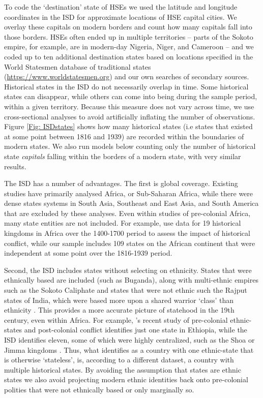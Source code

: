 To code the `destination' state of HSEs we used the latitude and longitude
coordinates in the ISD for approximate locations of HSE capital cities. We
overlay these capitals on modern borders and count how many capitals fall into
those borders. HSEs often ended up in multiple territories -- parts of the
Sokoto empire, for example, are in modern-day Nigeria, Niger, and Cameroon -- and
we coded up to ten additional destination states based on locations specified in
the World Statesmen database of traditional states
(\url{https://www.worldstatesmen.org}) and our own searches of secondary
sources. Historical states in the ISD do not necessarily overlap in time. Some
historical states can disappear, while others can come into being during the
sample period, within a given territory. Because this measure does not vary
across time, we use cross-sectional analyses to avoid artificially inflating the number of observations.  Figure \ref{Fig:
ISDstates} shows how many historical states (i.e states that existed at some
point between 1816 and 1939) are recorded within the boundaries of modern
states. We also run models below counting only the number of historical state
\textit{capitals} falling within the borders of a modern state, with very
similar results. 
    
The ISD has a number of advantages. The first is global coverage. Existing
studies have primarily analysed Africa, or Sub-Saharan Africa, while there were
dense states systems in South Asia, Southeast and East Asia, and South America
that are excluded by these analyses. Even within studies of pre-colonial Africa, many
state entities are not included. For example, \citet{Besley2014} use data for
19 historical kingdoms in Africa over the 1400-1700 period to assess the impact
of historical conflict, while our sample includes 109 states on the African continent
that were independent at some point over the 1816-1939 period.

    
Second, the ISD includes states without selecting on ethnicity.
States that were ethnically based are included (such as Buganda), along with
multi-ethnic empires such as the Sokoto Caliphate and states that were not
ethnic such the Rajput states of India, which were based
more upon a shared warrior `class' than ethnicity \citep[12]{Ramusack2004}. This
provides a more accurate picture of statehood in the 19th century, even within
Africa. For example, \citet{Paine2019}'s recent study of pre-colonial
ethnic-states and post-colonial conflict identifies just one state in Ethiopia,
while the ISD identifies eleven, some of which were highly centralized, such as
the Shoa or Jimma kingdoms \citep{Lewis2001}. Thus, what \citet{Paine2019}
identifies as a country with one ethnic-state that is otherwise `stateless', is,
according to a different dataset, a country with multiple historical states. By
avoiding the assumption that states are ethnic states we also avoid projecting
modern ethnic identities back onto pre-colonial polities that were not
ethnically based or only marginally so.

